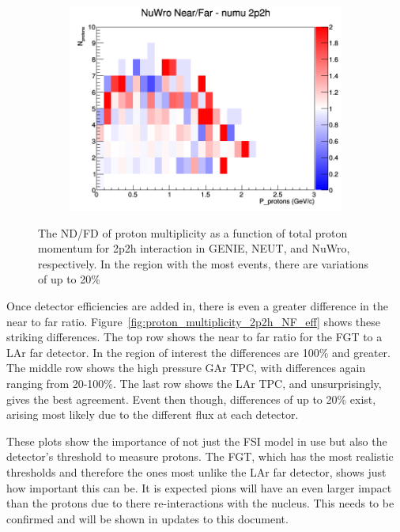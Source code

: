 \documentclass[12pt]{article}
\begin{document}
\begin{figure}[h]
\begin{subfigure}[b]{0.32\textwidth}
\includegraphics[width=\linewidth]{N_P/nominal/protons/ratios/2p2h_NuWro_numu_NF_N_P.png}
\end{subfigure}
\caption{The ND/FD of proton multiplicity as a function of total proton momentum for 2p2h interaction in GENIE, NEUT, and NuWro, respectively. In the region with the most events, there are variations of up to 20\%}
\label{fig:proton_multiplicity_2p2h_NF}
\end{figure}

Once detector efficiencies are added in, there is even a greater difference in the near to far ratio.  
Figure~\ref{fig:proton_multiplicity_2p2h_NF_eff} shows these striking differences.  
The top row shows the near to far ratio for the FGT to a LAr far detector.  
In the region of interest the differences are 100\% and greater.
The middle row shows the high pressure GAr TPC, with differences again ranging from 20-100\%.
The last row shows the LAr TPC, and unsurprisingly, gives the best agreement. 
Event then though, differences of up to 20\% exist, arising most likely due to the different flux at each detector. 

These plots show the importance of not just the FSI model in use but also the detector's threshold to measure protons. 
The FGT, which has the most realistic thresholds and therefore the ones most unlike the LAr far detector, shows just how important this can be.
It is expected pions will have an even larger impact than the protons due to there re-interactions with the nucleus.  
This needs to be confirmed and will be shown in updates to this document. 
\end{document}
